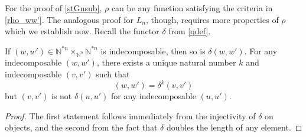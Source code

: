 \documentclass{amsbook} %
\newcommand{\ELn}{E\Lambda(\underline{n})}
\newcommand{\ELnn}{E\Lambda(\underline{2n})}
\numberwithin{section}{chapter}
\begin{document}
For the proof of \cref{stGnsub}, $\rho$ can be any function satisfying the criteria in \cref{rho_ww'}. The analogous proof for $L_n$, though, requires more properties of $\rho$ which we establish now. Recall the functor $\delta$ from \cref{qdef}.

\begin{lem}\label{rho_lemmas}
If $(w,w') \in \mathbb{N}^{\ast n} \times_{\mathbb{N}^n} \mathbb{N}^{\ast n}$ is indecomposable, then so is $\delta(w,w')$. For any indecomposable $(w,w')$, there exists a unique natural number $k$ and indecomposable $(v,v')$ such that
\[
(w,w') = \delta^k(v,v')
\]
but $(v,v')$ is not $\delta(u,u')$ for any indecomposable $(u,u')$.
\end{lem}
\begin{proof}
The first statement follows immediately from the injectivity of $\delta$ on objects, and the second from the fact that $\delta$ doubles the length of any element.
\end{proof}


\end{document}
